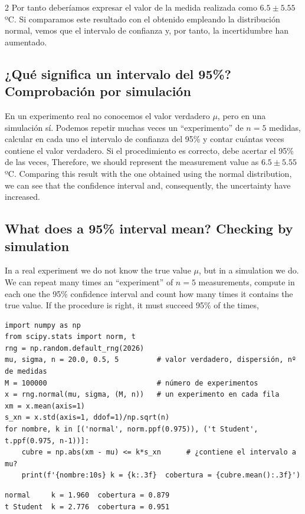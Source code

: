 \begin{paracol}{2}
Por tanto deberíamos expresar el valor de la medida realizada como $6.5\pm 5.55$ ºC. Si comparamos este resultado con el obtenido empleando la distribución normal, vemos que el intervalo de confianza y, por tanto, la incertidumbre han aumentado.

\subsection{¿Qué significa un intervalo del 95\%? Comprobación por simulación}\label{sec:cobertura}
En un experimento real no conocemos el valor verdadero $\mu$, pero en una simulación sí. Podemos repetir muchas veces un ``experimento'' de $n=5$ medidas, calcular en cada uno el intervalo de confianza del 95\% y contar cuántas veces contiene el valor verdadero. Si el procedimiento es correcto, debe acertar el 95\% de las veces,
\switchcolumn
Therefore, we should represent the measurement value as $6.5 \pm 5.55$ ºC. Comparing this result with the one obtained using the normal distribution, we can see that the confidence interval and, consequently, the uncertainty have increased.

\subsection{What does a 95\% interval mean? Checking by simulation}\label{sec:cobertura-2}
In a real experiment we do not know the true value $\mu$, but in a simulation we do. We can repeat many times an ``experiment'' of $n=5$ measurements, compute in each one the 95\% confidence interval and count how many times it contains the true value. If the procedure is right, it must succeed 95\% of the times,
\end{paracol}
\begin{verbatim}
import numpy as np
from scipy.stats import norm, t
rng = np.random.default_rng(2026)
mu, sigma, n = 20.0, 0.5, 5         # valor verdadero, dispersión, nº de medidas
M = 100000                          # número de experimentos
x = rng.normal(mu, sigma, (M, n))   # un experimento en cada fila
xm = x.mean(axis=1)
s_xn = x.std(axis=1, ddof=1)/np.sqrt(n)
for nombre, k in [('normal', norm.ppf(0.975)), ('t Student', t.ppf(0.975, n-1))]:
    cubre = np.abs(xm - mu) <= k*s_xn      # ¿contiene el intervalo a mu?
    print(f'{nombre:10s} k = {k:.3f}  cobertura = {cubre.mean():.3f}')
\end{verbatim}
\begin{verbatim}
normal     k = 1.960  cobertura = 0.879
t Student  k = 2.776  cobertura = 0.951
\end{verbatim}
